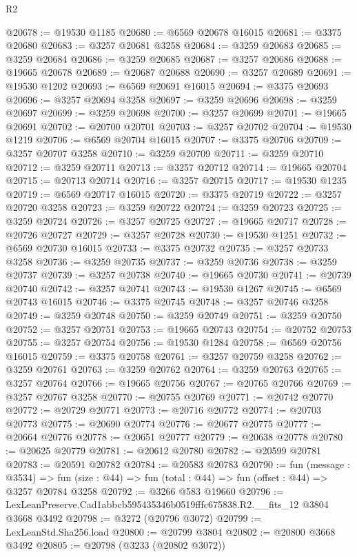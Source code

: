 \begin{lexlean}{R2}
\begin{coremodule}
@20678 := @19530 @1185
@20680 := @6569 @20678 @16015
@20681 := @3375 @20680
@20683 := @3257 @20681 @3258
@20684 := @3259 @20683
@20685 := @3259 @20684
@20686 := @3259 @20685
@20687 := @3257 @20686
@20688 := @19665 @20678
@20689 := @20687 @20688
@20690 := @3257 @20689
@20691 := @19530 @1202
@20693 := @6569 @20691 @16015
@20694 := @3375 @20693
@20696 := @3257 @20694 @3258
@20697 := @3259 @20696
@20698 := @3259 @20697
@20699 := @3259 @20698
@20700 := @3257 @20699
@20701 := @19665 @20691
@20702 := @20700 @20701
@20703 := @3257 @20702
@20704 := @19530 @1219
@20706 := @6569 @20704 @16015
@20707 := @3375 @20706
@20709 := @3257 @20707 @3258
@20710 := @3259 @20709
@20711 := @3259 @20710
@20712 := @3259 @20711
@20713 := @3257 @20712
@20714 := @19665 @20704
@20715 := @20713 @20714
@20716 := @3257 @20715
@20717 := @19530 @1235
@20719 := @6569 @20717 @16015
@20720 := @3375 @20719
@20722 := @3257 @20720 @3258
@20723 := @3259 @20722
@20724 := @3259 @20723
@20725 := @3259 @20724
@20726 := @3257 @20725
@20727 := @19665 @20717
@20728 := @20726 @20727
@20729 := @3257 @20728
@20730 := @19530 @1251
@20732 := @6569 @20730 @16015
@20733 := @3375 @20732
@20735 := @3257 @20733 @3258
@20736 := @3259 @20735
@20737 := @3259 @20736
@20738 := @3259 @20737
@20739 := @3257 @20738
@20740 := @19665 @20730
@20741 := @20739 @20740
@20742 := @3257 @20741
@20743 := @19530 @1267
@20745 := @6569 @20743 @16015
@20746 := @3375 @20745
@20748 := @3257 @20746 @3258
@20749 := @3259 @20748
@20750 := @3259 @20749
@20751 := @3259 @20750
@20752 := @3257 @20751
@20753 := @19665 @20743
@20754 := @20752 @20753
@20755 := @3257 @20754
@20756 := @19530 @1284
@20758 := @6569 @20756 @16015
@20759 := @3375 @20758
@20761 := @3257 @20759 @3258
@20762 := @3259 @20761
@20763 := @3259 @20762
@20764 := @3259 @20763
@20765 := @3257 @20764
@20766 := @19665 @20756
@20767 := @20765 @20766
@20769 := @3257 @20767 @3258
@20770 := @20755 @20769
@20771 := @20742 @20770
@20772 := @20729 @20771
@20773 := @20716 @20772
@20774 := @20703 @20773
@20775 := @20690 @20774
@20776 := @20677 @20775
@20777 := @20664 @20776
@20778 := @20651 @20777
@20779 := @20638 @20778
@20780 := @20625 @20779
@20781 := @20612 @20780
@20782 := @20599 @20781
@20783 := @20591 @20782
@20784 := @20583 @20783
@20790 := fun (message : @3534) =>
  fun (size : @44) => fun (total : @44) => fun (offset : @44) => @3257 @20784 @3258
@20792 := @3266 @583 @19660
@20796 := LexLeanPreserve.Cad1abbcb595435346b0519fffc675838.R2.__fits_12 @3804 @3668 @3492
@20798 := @3272 (@20796 @3072)
@20799 := LexLeanStd.Sha256.load
@20800 := @20799 @3804
@20802 := @20800 @3668 @3492
@20805 := @20798 (@3233 (@20802 @3072))

\end{coremodule}
\end{lexlean}
